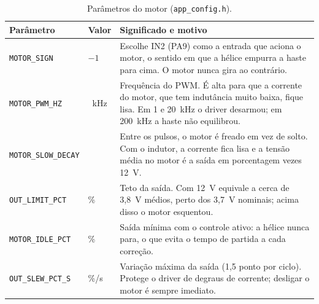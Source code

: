 \begin{table}[H]
\centering\caption{Parâmetros do motor (\texttt{app\_config.h}).}\label{tab:parametros_motor}
\begin{tabularx}{\textwidth}{>{\raggedright\arraybackslash}p{3.7cm}>{\raggedright\arraybackslash}p{2.3cm}X}
\hline\textbf{Parâmetro} & \textbf{Valor} & \textbf{Significado e motivo}\\\hline
\texttt{MOTOR\_SIGN} & $-1$ & Escolhe IN2 (PA9) como a entrada que aciona o motor, o sentido em que a hélice empurra a haste para cima. O motor nunca gira ao contrário.\\
\texttt{MOTOR\_PWM\_HZ} & 100~kHz & Frequência do PWM. É alta para que a corrente do motor, que tem indutância muito baixa, fique lisa. Em 1 e 20~kHz o driver desarmou; em 200~kHz a haste não equilibrou.\\
\texttt{MOTOR\_SLOW\_DECAY} & 1 & Entre os pulsos, o motor é freado em vez de solto. Com o indutor, a corrente fica lisa e a tensão média no motor é a saída em porcentagem vezes 12~V.\\
\texttt{OUT\_LIMIT\_PCT} & 32\% & Teto da saída. Com 12~V equivale a cerca de 3,8~V médios, perto dos 3,7~V nominais; acima disso o motor esquentou.\\
\texttt{MOTOR\_IDLE\_PCT} & 10\% & Saída mínima com o controle ativo: a hélice nunca para, o que evita o tempo de partida a cada correção.\\
\texttt{OUT\_SLEW\_PCT\_S} & 300\%/s & Variação máxima da saída (1,5 ponto por ciclo). Protege o driver de degraus de corrente; desligar o motor é sempre imediato.\\
\hline
\end{tabularx}
\end{table}

